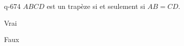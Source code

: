 \begin{truefalse}{q-674}
$ABCD$ est un trapèze si et seulement si $AB=CD$.
\item Vrai
\item* Faux
\end{truefalse}

